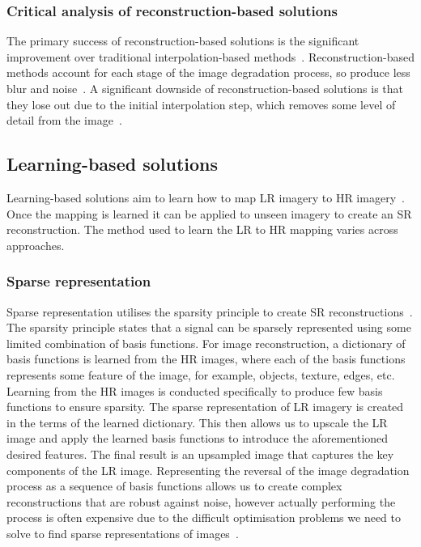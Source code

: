 \subsubsection{Critical analysis of reconstruction-based solutions}
The primary success of reconstruction-based solutions is the significant improvement over traditional interpolation-based methods~\cite{interpolation}. Reconstruction-based methods account for each stage of the image degradation process, so produce less blur and noise~\cite{interpolation}. A significant downside of reconstruction-based solutions is that they lose out due to the initial interpolation step, which removes some level of detail from the image~\cite{remoteSensingGANsReview}.

\subsection{Learning-based solutions}
Learning-based solutions aim to learn how to map LR imagery to HR imagery~\cite{superResRemoteSensingOverview}. Once the mapping is learned it can be applied to unseen imagery to create an SR reconstruction. The method used to learn the LR to HR mapping varies across approaches.

\subsubsection{Sparse representation}
Sparse representation utilises the sparsity principle to create SR reconstructions~\cite{superResRemoteSensingOverview}. The sparsity principle states that a signal can be sparsely represented using some limited combination of basis functions. For image reconstruction, a dictionary of basis functions is learned from the HR images, where each of the basis functions represents some feature of the image, for example, objects, texture, edges, etc. Learning from the HR images is conducted specifically to produce few basis functions to ensure sparsity. The sparse representation of LR imagery is created in the terms of the learned dictionary. This then allows us to upscale the LR image and apply the learned basis functions to introduce the aforementioned desired features. The final result is an upsampled image that captures the key components of the LR image. Representing the reversal of the image degradation process as a sequence of basis functions allows us to create complex reconstructions that are robust against noise, however actually performing the process is often expensive due to the difficult optimisation problems we need to solve to find sparse representations of images~\cite{sparseRep}.

